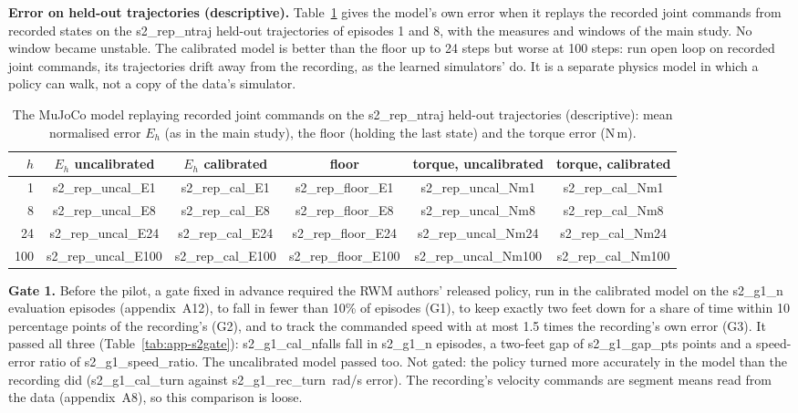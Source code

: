 \textbf{Error on held-out trajectories (descriptive).} Table~\ref{tab:app-s2fid} gives the model's own error when it
replays the recorded joint commands from recorded states on the {{s2_rep_ntraj}} held-out trajectories of episodes 1
and 8, with the measures and windows of the main study. No window became unstable. The calibrated model is better than
the floor up to 24 steps but worse at 100 steps: run open loop on recorded joint commands, its trajectories drift
away from the recording, as the learned simulators' do. It is a separate physics model in which a policy can walk,
not a copy of the data's simulator.

\begin{table}[h]
\centering
\caption{The MuJoCo model replaying recorded joint commands on the {{s2_rep_ntraj}} held-out trajectories
(descriptive): mean normalised error $E_h$ (as in the main study), the floor (holding the last state) and the torque
error (N\,m).}
\label{tab:app-s2fid}
\footnotesize
\begin{tabular}{@{}rccccc@{}}
\toprule
$h$ & $E_h$ uncalibrated & $E_h$ calibrated & floor & torque, uncalibrated & torque, calibrated \\
\midrule
1 & {{s2_rep_uncal_E1}} & {{s2_rep_cal_E1}} & {{s2_rep_floor_E1}} & {{s2_rep_uncal_Nm1}} & {{s2_rep_cal_Nm1}} \\
8 & {{s2_rep_uncal_E8}} & {{s2_rep_cal_E8}} & {{s2_rep_floor_E8}} & {{s2_rep_uncal_Nm8}} & {{s2_rep_cal_Nm8}} \\
24 & {{s2_rep_uncal_E24}} & {{s2_rep_cal_E24}} & {{s2_rep_floor_E24}} & {{s2_rep_uncal_Nm24}} & {{s2_rep_cal_Nm24}} \\
100 & {{s2_rep_uncal_E100}} & {{s2_rep_cal_E100}} & {{s2_rep_floor_E100}} & {{s2_rep_uncal_Nm100}} & {{s2_rep_cal_Nm100}} \\
\bottomrule
\end{tabular}
\end{table}

\textbf{Gate 1.} Before the pilot, a gate fixed in advance required the RWM authors' released policy, run in the
calibrated model on the {{s2_g1_n}} evaluation episodes (appendix~A12), to fall in fewer than 10\% of episodes (G1),
to keep exactly two feet down for a share of time within 10 percentage points of the recording's (G2), and to track
the commanded speed with at most 1.5 times the recording's own error (G3). It passed all three
(Table~\ref{tab:app-s2gate}): {{s2_g1_cal_nfalls}} fall in {{s2_g1_n}} episodes, a two-feet gap of {{s2_g1_gap_pts}}
points and a speed-error ratio of {{s2_g1_speed_ratio}}. The uncalibrated model passed too. Not gated: the policy
turned more accurately in the model than the recording did ({{s2_g1_cal_turn}} against {{s2_g1_rec_turn}}~rad/s
error). The recording's velocity commands are segment means read from the data (appendix~A8), so this comparison is
loose.

